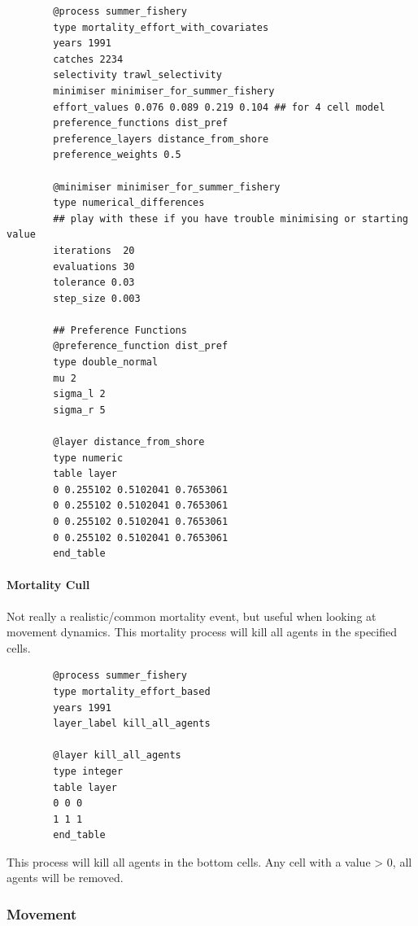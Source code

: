 {\small{\begin{verbatim}
		@process summer_fishery
		type mortality_effort_with_covariates
		years 1991
		catches 2234
		selectivity trawl_selectivity
		minimiser minimiser_for_summer_fishery
		effort_values 0.076 0.089 0.219 0.104 ## for 4 cell model
		preference_functions dist_pref
		preference_layers distance_from_shore
		preference_weights 0.5
		
		@minimiser minimiser_for_summer_fishery
		type numerical_differences
		## play with these if you have trouble minimising or starting value
		iterations	20 
		evaluations 30
		tolerance 0.03
		step_size 0.003
		
		## Preference Functions
		@preference_function dist_pref
		type double_normal
		mu 2
		sigma_l 2
		sigma_r 5
			
		@layer distance_from_shore
		type numeric
		table layer
		0 0.255102 0.5102041 0.7653061
		0 0.255102 0.5102041 0.7653061
		0 0.255102 0.5102041 0.7653061
		0 0.255102 0.5102041 0.7653061
		end_table	
\end{verbatim}}}


\paragraph{Mortality Cull}
Not really a realistic/common mortality event, but useful when looking at movement dynamics. This mortality process will kill all agents in the specified cells.


{\small{\begin{verbatim}
		@process summer_fishery
		type mortality_effort_based
		years 1991
		layer_label kill_all_agents
		
		@layer kill_all_agents
		type integer
		table layer
		0 0 0
		1 1 1 
		end_table
		\end{verbatim}}}
This process will kill all agents in the bottom cells. Any cell with a value > 0, all agents will be removed.
\subsubsection{Movement}
